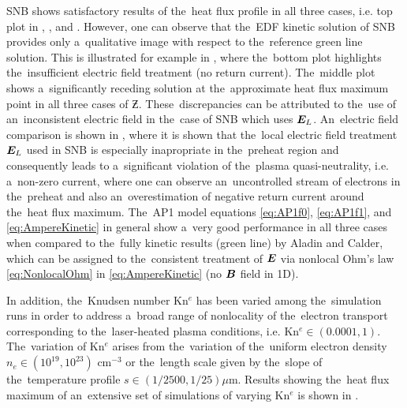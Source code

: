 SNB shows satisfactory results of the~heat flux profile in all three cases, 
i.e. top plot in , , 
and . However, one can observe that the~EDF 
kinetic solution of SNB provides only a~qualitative image with respect to
the~reference green line solution. This is illustrated for example in
, where the~bottom plot highlights the~insufficient
electric field treatment (no return current). The~middle plot
shows a~significantly receding solution at the~approximate heat flux maximum
point in all three cases of $\Zbar$. 
These~discrepancies can be attributed to the~use of an~inconsistent 
electric field in the~case of SNB which uses $\boldsymbol{E}_L$. An~electric field 
comparison is shown in , where it is shown that 
the~local electric field treatment $\boldsymbol{E}_L$ used in SNB is especially 
inapropriate in the~preheat region and consequently leads to 
a~significant violation of the~plasma quasi-neutrality,
i.e. a~non-zero current, where one can observe an~uncontrolled stream of 
electrons in the~preheat and also an~overestimation of negative return current
around the~heat flux maximum.
The~AP1 model equations \eqref{eq:AP1f0}, \eqref{eq:AP1f1}, 
and \eqref{eq:AmpereKinetic} in general show a~very good performance 
in all three cases when compared to the~fully kinetic results 
(green line) by Aladin and Calder, which can be assigned to the~consistent 
treatment of $\boldsymbol{E}$ via nonlocal Ohm's law \eqref{eq:NonlocalOhm} in
 \eqref{eq:AmpereKinetic} (no $\boldsymbol{B}$ field in 1D).

In addition, the~Knudsen number Kn$^e$ has been varied among the~simulation 
runs in order to address a~broad range of nonlocality of 
the~electron transport corresponding 
to the~laser-heated plasma conditions, i.e. Kn$^e \in (0.0001, 1)$. 
The~variation of Kn$^e$ arises from the~variation
of the~uniform electron density $n_e \in (10^{19}, 10^{23})$ cm$^{-3}$ or 
the~length scale given by the~slope of the~temperature profile 
$s \in (1/2500, 1/25) \mu$m. Results showing the~heat flux maximum 
of an~extensive set of simulations of
varying Kn$^e$ is shown in .
 
